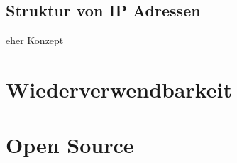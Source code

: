 \subsection{ Struktur von IP Adressen}
eher Konzept


\section{Wiederverwendbarkeit}
\section{Open Source}
%
